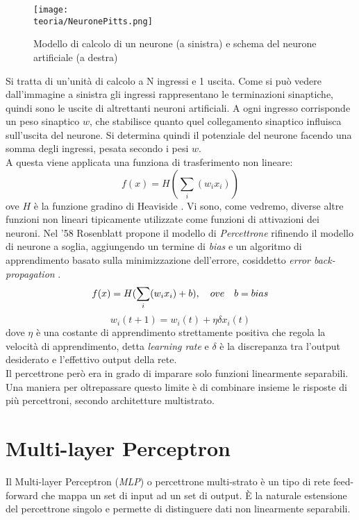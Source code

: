 \begin{figure}[h!]
 \centering
 \texttt{[image: \\teoria/NeuronePitts.png]}
 \caption{Modello di calcolo di un neurone (a sinistra) e schema del neurone artificiale (a destra)}
 \label{fig:neuron}
\end{figure}
Si tratta di un'unità di calcolo a N ingressi e 1 uscita. Come si può vedere dall'immagine a
sinistra gli ingressi rappresentano le terminazioni sinaptiche, quindi sono le uscite di altrettanti
neuroni artificiali. A ogni ingresso corrisponde un peso sinaptico $w$, che stabilisce quanto quel
collegamento sinaptico influisca sull'uscita del neurone. Si determina quindi il potenziale del neurone facendo una somma degli ingressi, pesata secondo i pesi $w$. \\
A questa viene applicata una funziona di trasferimento non lineare: 
\begin{equation}
 f(x) = H(\sum_{i}(w_i x_i))
\end{equation} 
ove $H$ è la funzione gradino di Heaviside \parencite{WHeaviside}. Vi sono, come vedremo, diverse altre funzioni non lineari tipicamente utilizzate come funzioni di attivazioni dei neuroni. 
Nel '58 Rosenblatt propone il modello di \emph{Percettrone} rifinendo il modello di neurone a soglia, aggiungendo un termine di \emph{bias} e un algoritmo di apprendimento basato sulla minimizzazione dell'errore, cosiddetto \emph{error back-propagation} \parencite{WPercettrone}.
\begin{equation}
 f(x) = H(\sum_{i}(w_i x_i)+b),\quad ove \quad b = bias \\
\end{equation}
\begin{equation} 
 w_i(t+1) = w_i(t)+\eta \delta x_i(t)
\end{equation}
dove $\eta$ è una costante di apprendimento strettamente positiva che regola la velocità di apprendimento, detta \emph{learning rate} e $\delta$ è la discrepanza tra l'output desiderato e l'effettivo output della rete. 
\\
Il percettrone però era in grado di imparare solo funzioni linearmente separabili. Una maniera per oltrepassare questo limite è di combinare insieme le risposte di più percettroni, secondo architetture multistrato. 

\section{Multi-layer Perceptron}
\label{sec:mlp}
Il Multi-layer Perceptron (\textit{MLP}) o percettrone multi-strato è un tipo di rete feed-forward che mappa un set di input ad un set di output. È la naturale estensione del percettrone singolo e permette di distinguere dati non linearmente separabili.

